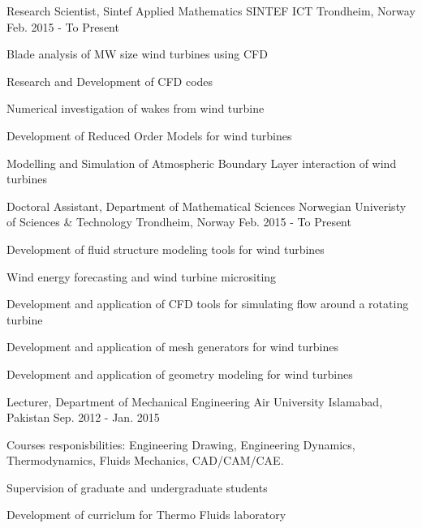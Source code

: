 \begin{cventries}
	\cventry
	{Research Scientist, Sintef Applied Mathematics} %
	{SINTEF ICT} %
	{Trondheim, Norway} %
	{Feb. 2015 - To Present} %
	{
		\begin{cvitems} %
			\item {Blade analysis of MW size wind turbines using CFD}
			\item {Research and Development of  CFD codes}
			 \item{Numerical investigation of wakes from wind turbine}
			  \item{Development of Reduced Order Models for wind turbines}
			  	  \item{Modelling and Simulation of Atmospheric Boundary Layer interaction of wind turbines}
		\end{cvitems}
	}
  \cventry
  {Doctoral Assistant, Department of Mathematical Sciences} %
  {Norwegian Univeristy of Sciences \& Technology} %
  {Trondheim, Norway} %
  {Feb. 2015 - To Present} %
  {
  	\begin{cvitems} 
  		\item {Development of fluid structure modeling tools for wind turbines}
  		\item {Wind energy forecasting and wind turbine micrositing}
  		\item {Development and application of CFD tools for simulating flow around a rotating turbine}
  		\item{Development and application of mesh generators for wind turbines}
  		\item{Development and application of geometry modeling for wind turbines}
  	\end{cvitems}
  }
\cventry
{Lecturer, Department of Mechanical Engineering} %
{Air University} %
{Islamabad, Pakistan} %
{Sep. 2012 - Jan. 2015} %
{
	\begin{cvitems} %
\item {Courses responisbilities: Engineering Drawing, Engineering Dynamics, Thermodynamics, Fluids Mechanics, CAD/CAM/CAE.}
\item {Supervision of graduate and undergraduate students}
\item {Development of curriclum for Thermo Fluids laboratory}

\end{cvitems}}
\end{cventries}
